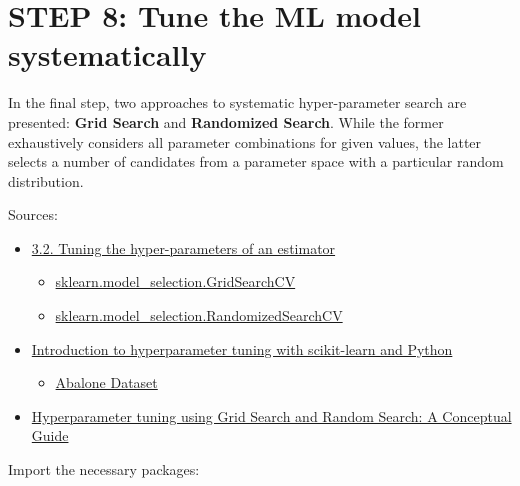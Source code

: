 \documentclass [oneside,10pt,a4paper,ngerman,BCOR10mm,headsepline,parindent,final]{scrartcl}
\providecommand{\tightlist}{%
      \setlength{\itemsep}{0pt}\setlength{\parskip}{0pt}}
\begin{document}
    \hypertarget{step-8-tune-the-ml-model-systematically}{%
\section{STEP 8: Tune the ML model
systematically}\label{step-8-tune-the-ml-model-systematically}}

In the final step, two approaches to systematic hyper-parameter search
are presented: \textbf{Grid Search} and \textbf{Randomized Search}.
While the former exhaustively considers all parameter combinations for
given values, the latter selects a number of candidates from a parameter
space with a particular random distribution.

Sources:

\begin{itemize}
\tightlist
\item
  \href{https://scikit-learn.org/stable/modules/grid_search.html}{3.2.
  Tuning the hyper-parameters of an estimator}

  \begin{itemize}
  \tightlist
  \item
    \href{https://scikit-learn.org/stable/modules/generated/sklearn.model_selection.GridSearchCV.html}{sklearn.model\_selection.GridSearchCV}
  \item
    \href{https://scikit-learn.org/stable/modules/generated/sklearn.model_selection.RandomizedSearchCV.html\#sklearn.model_selection.RandomizedSearchCV}{sklearn.model\_selection.RandomizedSearchCV}
  \end{itemize}
\item
  \href{https://pyimagesearch.com/2021/05/17/introduction-to-hyperparameter-tuning-with-scikit-learn-and-python/}{Introduction
  to hyperparameter tuning with scikit-learn and Python}

  \begin{itemize}
  \tightlist
  \item
    \href{https://www.kaggle.com/datasets/rodolfomendes/abalone-dataset?resource=download}{Abalone
    Dataset}
  \end{itemize}
\item
  \href{https://medium.com/@jackstalfort/hyperparameter-tuning-using-grid-search-and-random-search-f8750a464b35}{Hyperparameter
  tuning using Grid Search and Random Search: A Conceptual Guide}
\end{itemize}

    Import the necessary packages:
\end{document}
